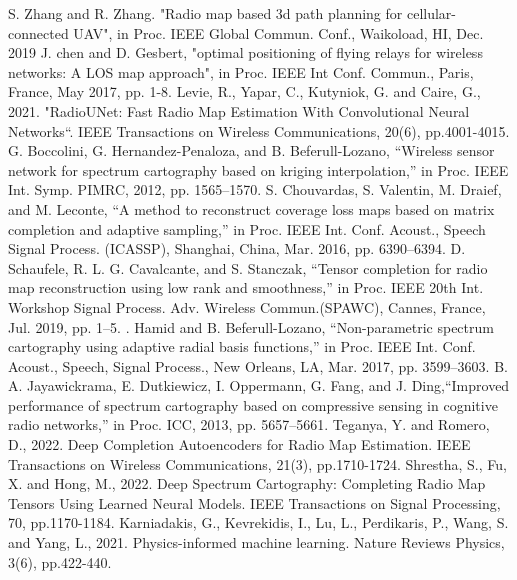 \documentclass[conference]{IEEEtran}
\begin{document}
\begin{thebibliography}{00}
 S. Zhang and R. Zhang. "Radio map based 3d path planning for cellular-connected UAV", in Proc. IEEE Global Commun. Conf., Waikoload, HI, Dec. 2019
 J. chen and D. Gesbert, "optimal positioning of flying relays for wireless networks: A LOS map approach", in Proc. IEEE Int Conf. Commun., Paris, France, May 2017, pp. 1-8.
 Levie, R., Yapar, C., Kutyniok, G. and Caire, G., 2021. "RadioUNet: Fast Radio Map Estimation With Convolutional Neural Networks“. IEEE Transactions on Wireless Communications, 20(6), pp.4001-4015.
 G. Boccolini, G. Hernandez-Penaloza, and B. Beferull-Lozano, “Wireless sensor network for spectrum cartography based on kriging interpolation,” in Proc. IEEE Int. Symp. PIMRC, 2012, pp. 1565–1570.
 S. Chouvardas, S. Valentin, M. Draief, and M. Leconte, “A method to reconstruct coverage loss maps based on matrix completion and adaptive sampling,” in Proc. IEEE Int. Conf. Acoust., Speech Signal Process.
(ICASSP), Shanghai, China, Mar. 2016, pp. 6390–6394.
 D. Schaufele, R. L. G. Cavalcante, and S. Stanczak, “Tensor completion for radio map reconstruction using low rank and smoothness,” in
Proc. IEEE 20th Int. Workshop Signal Process. Adv. Wireless Commun.(SPAWC), Cannes, France, Jul. 2019, pp. 1–5.
 . Hamid and B. Beferull-Lozano, “Non-parametric spectrum cartography using adaptive radial basis functions,” in Proc. IEEE Int. Conf. Acoust., Speech, Signal Process., New Orleans, LA, Mar. 2017, pp. 3599–3603.
  B. A. Jayawickrama, E. Dutkiewicz, I. Oppermann, G. Fang, and J. Ding,“Improved performance of spectrum cartography based on compressive sensing in cognitive radio networks,” in Proc. ICC, 2013, pp. 5657–5661.
 Teganya, Y. and Romero, D., 2022. Deep Completion Autoencoders for Radio Map Estimation. IEEE Transactions on Wireless Communications, 21(3), pp.1710-1724.
 Shrestha, S., Fu, X. and Hong, M., 2022. Deep Spectrum Cartography: Completing Radio Map Tensors Using Learned Neural Models. IEEE Transactions on Signal Processing, 70, pp.1170-1184.
  Karniadakis, G., Kevrekidis, I., Lu, L., Perdikaris, P., Wang, S. and Yang, L., 2021. Physics-informed machine learning. Nature Reviews Physics, 3(6), pp.422-440.

\end{thebibliography}
\end{document}
